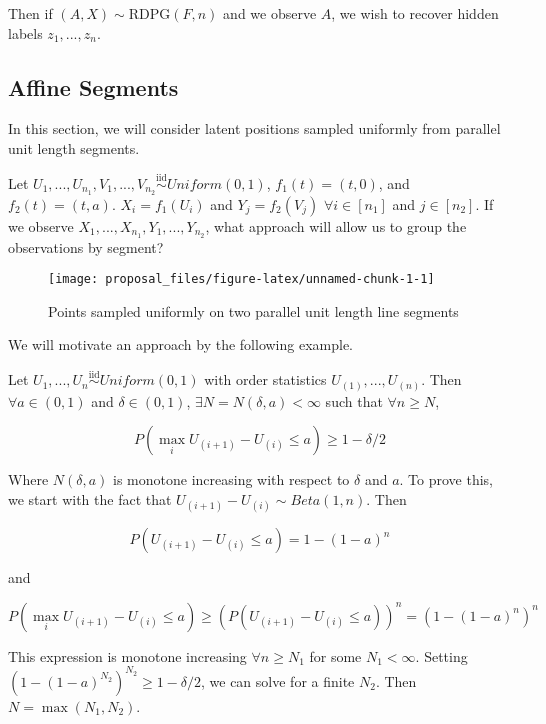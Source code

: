 \documentclass[
  11pt,
]{article}
\begin{document}
Then if \((A, X) \sim \text{RDPG}(F, n)\) and we observe \(A\), we wish
to recover hidden labels \(z_1, ..., z_n\).

\hypertarget{affine-segments}{%
\subsection{Affine Segments}\label{affine-segments}}

In this section, we will consider latent positions sampled uniformly
from parallel unit length segments.

\begin{example}
Let $U_1, ..., U_{n_1}, V_1, ..., V_{n_2} \stackrel{\text{iid}}{\sim}Uniform(0, 1)$, $f_1(t) = (t, 0)$, and $f_2(t) = (t, a)$. $X_i = f_1(U_i)$ and $Y_j = f_2(V_j)$ $\forall i \in [n_1]$ and $j \in [n_2]$. If we observe $X_1, ..., X_{n_1}, Y_1, ..., Y_{n_2}$, what approach will allow us to group the observations by segment?
\end{example}

\begin{figure}[H]

{\centering \texttt{[image: proposal\_files/figure-latex/unnamed-chunk-1-1]} 

}

\caption{Points sampled uniformly on two parallel unit length line segments}\label{fig:unnamed-chunk-1}
\end{figure}

We will motivate an approach by the following example.

\begin{example}
Let $U_1, ..., U_n \stackrel{\text{iid}}{\sim}Uniform(0, 1)$ with order statistics 
$U_{(1)}, ..., U_{(n)}$. Then $\forall a \in (0, 1)$ and $\delta \in (0, 1)$, $\exists N = N(\delta, a) < \infty$ such that $\forall n \geq N$, 

\begin{equation}
P(\max_i U_{(i+1)} - U_{(i)} \leq a) \geq 1 - \delta / 2
\end{equation}

Where $N(\delta, a)$ is monotone increasing with respect to $\delta$ and $a$. To prove this, we start with the fact that $U_{(i+1)} - U_{(i)} \sim Beta(1, n)$. Then 

\begin{equation}
P(U_{(i+1)} - U_{(i)} \leq a) = 1 - (1 - a)^n
\end{equation}

and 

\begin{equation}
\label{eq:unsolvable}
P(\max_i U_{(i+1)} - U_{(i)} \leq a) \geq (P(U_{(i+1)} - U_{(i)} \leq a))^n = (1 - (1 - a)^n)^n
\end{equation}

This expression is monotone increasing $\forall n \geq N_1$ for some $N_1 < \infty$. 
Setting $(1 - (1 - a)^{N_2})^{N_2} \geq 1 - \delta / 2$, we can solve for a finite ${N_2}$. Then $N = \max(N_1, N_2)$.
\end{example}
\end{document}
